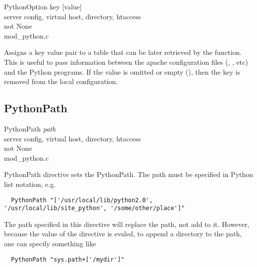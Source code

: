 PythonOption key [value] \\
server config, virtual host, directory, htaccess\\
not None\\
mod_python.c

Assigns a key value pair to a table that can be later retrieved by the
 function. This is useful to pass information
between the apache configuration files (,
, etc) and the Python programs. If the value is omitted or empty (),
then the key is removed from the local configuration.

\subsection{PythonPath\label{dir-other-pp}}

PythonPath \emph{path} \\
server config, virtual host, directory, htaccess\\
not None\\
mod_python.c

PythonPath directive sets the PythonPath. The path must be specified
in Python list notation, e.g.

\begin{verbatim}
  PythonPath "['/usr/local/lib/python2.0', '/usr/local/lib/site_python', '/some/other/place']"
\end{verbatim}

The path specified in this directive will replace the path, not add to
it. However, because the value of the directive is evaled, to append a
directory to the path, one can specify something like

\begin{verbatim}
  PythonPath "sys.path+['/mydir']"
\end{verbatim}

